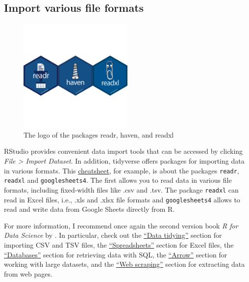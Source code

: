 \documentclass[
  12pt,
  oneside]{book}
\begin{document}
\hypertarget{import-various-file-formats}{%
\subsection{Import various file formats}\label{import-various-file-formats}}

\begin{figure}
\centering
\includegraphics[width=0.5\textwidth,height=\textheight]{fig/import-logo.png}
\caption{\label{fig:import-logo} The logo of the packages readr, haven, and readxl}
\end{figure}

RStudio provides convenient data import tools that can be accessed by clicking \emph{File \textgreater{} Import Dataset}. In addition, tidyverse offers packages for importing data in various formats. This \href{https://posit.co/wp-content/uploads/2022/10/data-import.pdf}{cheatsheet}, for example, is about the packages \texttt{readr}, \texttt{readxl} and \texttt{googlesheets4}. The first allows you to read data in various file formats, including fixed-width files like .csv and .tsv. The package \texttt{readxl} can read in Excel files, i.e., .xls and .xlsx file formats and \texttt{googlesheets4} allows to read and write data from Google Sheets directly from R.

For more information, I recommend once again the second version book \emph{R for Data Science} by \href{https://r4ds.hadley.nz/}{\citet{Wickham2023R}}. In particular, check out the \href{https://r4ds.hadley.nz/data-tidy.html}{``Data tidying''} section for importing CSV and TSV files, the \href{https://r4ds.hadley.nz/spreadsheets.html}{``Spreadsheets''} section for Excel files, the \href{https://r4ds.hadley.nz/databases.html}{``Databases''} section for retrieving data with SQL, the \href{https://r4ds.hadley.nz/arrow.html}{``Arrow''} section for working with large datasets, and the \href{https://r4ds.hadley.nz/webscraping.html}{``Web scraping''} section for extracting data from web pages.
\end{document}
